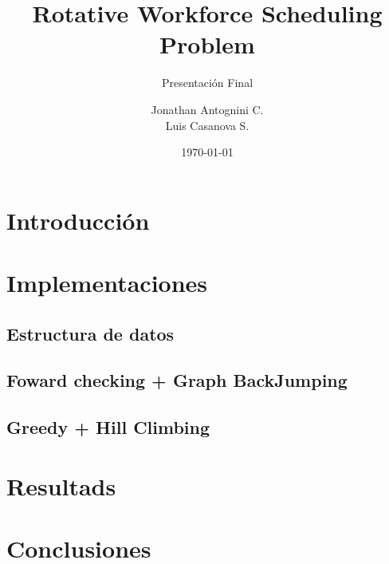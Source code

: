 \documentclass{beamer}
\title{Rotative Workforce Scheduling Problem}
\subtitle{Presentación Final}
\author{Jonathan Antognini C.\\
		Luis Casanova S.
}
\institute[]{Universidad Técnica Federico Santa María}
\date{\today}
\begin{document}
    \frame{\titlepage}
    \frame{\tableofcontents}
	\section{Introducción}
		
	
	\section{Implementaciones}
		\subsection{Estructura de datos}
		
		\subsection{Foward checking + Graph BackJumping}
		
		\subsection{Greedy + Hill Climbing}
		

	\section{Resultads}
		

	\section{Conclusiones}
			
\end{document}

